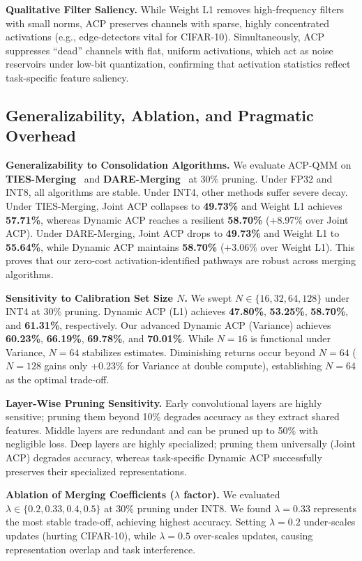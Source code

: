 \documentclass{article}
\theoremstyle{plain}
\theoremstyle{definition}
\theoremstyle{remark}
\begin{document}
\textbf{Qualitative Filter Saliency.} While Weight L1 removes high-frequency filters with small norms, ACP preserves channels with sparse, highly concentrated activations (e.g., edge-detectors vital for CIFAR-10). Simultaneously, ACP suppresses ``dead'' channels with flat, uniform activations, which act as noise reservoirs under low-bit quantization, confirming that activation statistics reflect task-specific feature saliency.

\subsection{Generalizability, Ablation, and Pragmatic Overhead}
\textbf{Generalizability to Consolidation Algorithms.} We evaluate ACP-QMM on \textbf{TIES-Merging}~\cite{yadav2023ties} and \textbf{DARE-Merging}~\cite{jin2023dare} at 30\% pruning. Under FP32 and INT8, all algorithms are stable. Under INT4, other methods suffer severe decay. Under TIES-Merging, Joint ACP collapses to \textbf{49.73\%} and Weight L1 achieves \textbf{57.71\%}, whereas Dynamic ACP reaches a resilient \textbf{58.70\%} (+8.97\% over Joint ACP). Under DARE-Merging, Joint ACP drops to \textbf{49.73\%} and Weight L1 to \textbf{55.64\%}, while Dynamic ACP maintains \textbf{58.70\%} (+3.06\% over Weight L1). This proves that our zero-cost activation-identified pathways are robust across merging algorithms.

\textbf{Sensitivity to Calibration Set Size $N$.} We swept $N \in \{16, 32, 64, 128\}$ under INT4 at 30\% pruning. Dynamic ACP (L1) achieves \textbf{47.80\%}, \textbf{53.25\%}, \textbf{58.70\%}, and \textbf{61.31\%}, respectively. Our advanced Dynamic ACP (Variance) achieves \textbf{60.23\%}, \textbf{66.19\%}, \textbf{69.78\%}, and \textbf{70.01\%}. While $N=16$ is functional under Variance, $N=64$ stabilizes estimates. Diminishing returns occur beyond $N=64$ ($N=128$ gains only +0.23\% for Variance at double compute), establishing $N=64$ as the optimal trade-off.

\textbf{Layer-Wise Pruning Sensitivity.} Early convolutional layers are highly sensitive; pruning them beyond 10\% degrades accuracy as they extract shared features. Middle layers are redundant and can be pruned up to 50\% with negligible loss. Deep layers are highly specialized; pruning them universally (Joint ACP) degrades accuracy, whereas task-specific Dynamic ACP successfully preserves their specialized representations.

\textbf{Ablation of Merging Coefficients ($\lambda$ factor).} We evaluated $\lambda \in \{0.2, 0.33, 0.4, 0.5\}$ at 30\% pruning under INT8. We found $\lambda = 0.33$ represents the most stable trade-off, achieving highest accuracy. Setting $\lambda = 0.2$ under-scales updates (hurting CIFAR-10), while $\lambda = 0.5$ over-scales updates, causing representation overlap and task interference.
\end{document}
